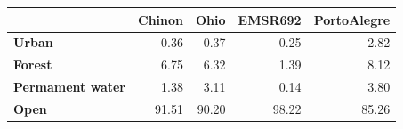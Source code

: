\begin{tabular}{lrrrr}
\toprule
 & Chinon & Ohio & EMSR692 & PortoAlegre \\
\midrule
\textbf{Urban} & 0.36 & 0.37 & 0.25 & 2.82 \\
\textbf{Forest} & 6.75 & 6.32 & 1.39 & 8.12 \\
\textbf{Permament water} & 1.38 & 3.11 & 0.14 & 3.80 \\
\textbf{Open} & 91.51 & 90.20 & 98.22 & 85.26 \\
\bottomrule
\end{tabular}
